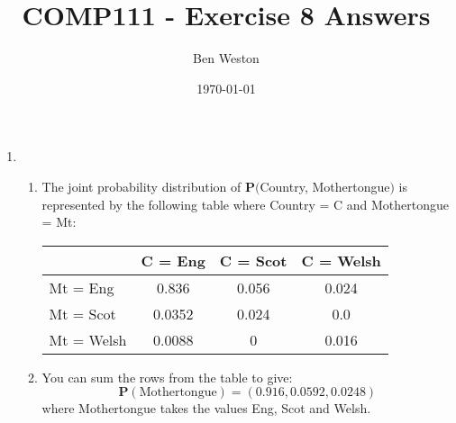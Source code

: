 \documentclass{article}
\title{COMP111 - Exercise 8 Answers}
\author{Ben Weston}
\date{\today}
\begin{document}
\maketitle
\begin{enumerate}
        \item
                \begin{enumerate}
                        \item{
                                        The joint probability distribution of $\mathbf{P}($Country, Mothertongue$)$ is represented by the following table where Country = C and Mothertongue = Mt:
                                                
                                        \begin{center}
                                                \begin{tabular}{|l|c|c|c|}
                                                        \hline
                                                        & C = Eng & C = Scot & C = Welsh\\
                                                        \hline
                                                        Mt = Eng & 0.836 & 0.056 & 0.024\\
                                                        \hline
                                                        Mt = Scot & 0.0352 & 0.024 & 0.0\\
                                                        \hline
                                                        Mt = Welsh & 0.0088 & 0 & 0.016\\
                                                        \hline
                                                \end{tabular}
                                        \end{center}
                                }
                        \item You can sum the rows from the table to give: 
                                $$\mathbf{P}(\text{Mothertongue}) = (0.916,0.0592,0.0248)$$
                                where Mothertongue takes the values Eng, Scot and Welsh.
                \end{enumerate}
\end{enumerate}
\end{document}
